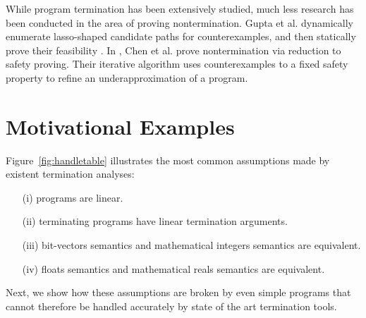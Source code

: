 \documentclass[preprint]{sigplanconf}
\theoremstyle{definition}
\begin{document}

While program termination has been extensively studied, much less research has been conducted in the area of proving nontermination.
Gupta et al. dynamically enumerate lasso-shaped candidate
paths for counterexamples, and then statically prove their feasibility \cite{DBLP:conf/popl/GuptaHMRX08}. 
In \cite{DBLP:conf/tacas/ChenCFNO14}, Chen et al. prove nontermination via
reduction to safety proving. Their iterative algorithm uses counterexamples to a fixed safety property
to refine an underapproximation of a program. 



\section{Motivational Examples} \label{sec:motivation}
Figure~\ref{fig:handletable} illustrates the most common assumptions made by existent termination analyses:
\begin{itemize}
\item[(i)] programs are linear.
\item[(ii)] terminating programs have linear termination arguments.
\item[(iii)] bit-vectors semantics and mathematical integers semantics are equivalent.
\item[(iv)] floats semantics and mathematical reals semantics are equivalent.
\end{itemize}  

Next, we show how these assumptions are broken by even simple programs that cannot therefore be handled accurately by state of the art termination tools.


\end{document}
